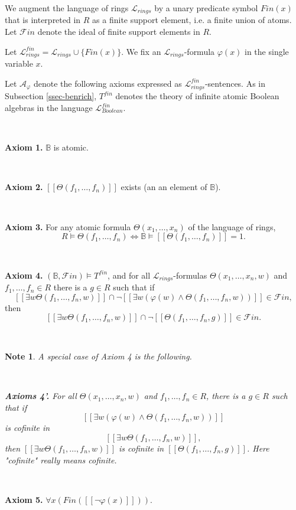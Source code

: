 \documentclass[12pt]{amsart}
\def\B{\mathbb{B}}
\def\cL{\mathcal{L}}
\def\cL{\mathcal{L}}
\numberwithin{equation}{section}
\newtheorem{note}{Note}[section]
\begin{document}
We augment the language of rings $\cL_{rings}$ by a unary predicate symbol 
$Fin(x)$ that is interpreted in $R$ as a finite support element, i.e. a finite union of atoms. Let $\mathcal{F}in$ denote the ideal of finite support elements in $R$. 

Let $\cL_{rings}^{fin}=\cL_{rings}\cup \{Fin(x)\}$. We fix an $\cL_{rings}$-formula $\varphi(x)$ in the single variable $x$. 

Let $\mathcal{A}_{\varphi}$ denote the following axioms expressed as $\cL_{rings}^{fin}$-sentences. As in Subsection \ref{ssec-benrich}, $T^{fin}$ denotes the theory of infinite atomic Boolean
algebras in the language $\cL_{Boolean}^{fin}$.

\

{\bf Axiom 1.} $\B$ is atomic.

\

{\bf Axiom 2.} $[[\Theta(f_1,\dots,f_n)]]$ exists (an an element of $\B$).

\

{\bf Axiom 3.} For any atomic formula $\Theta(x_1,\dots,x_n)$ of the language of rings,
$$R\models \Theta(f_1,\dots,f_n) \Leftrightarrow \B\models [[\Theta(f_1,\dots,f_n)]]=1.$$

\

{\bf Axiom 4.} $(\B,\mathcal{F}in)\models T^{fin}$, and for all $\cL_{rings}$-formulas 
$\Theta(x_1,\dots,x_n,w)$ and $f_1,\dots,f_n\in R$ there is a $g\in R$ such that if 
$$[[\exists w \Theta(f_1,\dots,f_n,w)]]  \cap \neg [[\exists w (\varphi(w) \wedge \Theta(f_1,\dots,f_n,w))]]\in \mathcal{F}in,$$
then
$$[[\exists w \Theta(f_1,\dots,f_n,w)]]\cap \neg [[\Theta(f_1,\dots,f_n,g)]]\in \mathcal{F}in.$$

\

\begin{note} A special case of Axiom 4 is the following. 

\

{\bf Axioms 4'.} For all $\Theta(x_1,\dots,x_n,w)$ and $f_1,\dots,f_n\in R$, there is a $g\in R$ such that if 
$$[[\exists w (\varphi(w) \wedge \Theta(f_1,\dots,f_n,w))]]$$ 
is cofinite in 
$$[[\exists w \Theta(f_1,\dots,f_n,w)]],$$ 
then $[[\exists w \Theta(f_1,\dots,f_n,w)]]$ is cofinite in 
$[[\Theta(f_1,\dots,f_n,g)]]$. Here "cofinite" really means cofinite.\end{note}

\

{\bf Axiom 5.} $\forall x (Fin([[\neg \varphi(x)]]))$.

\
\end{document}

